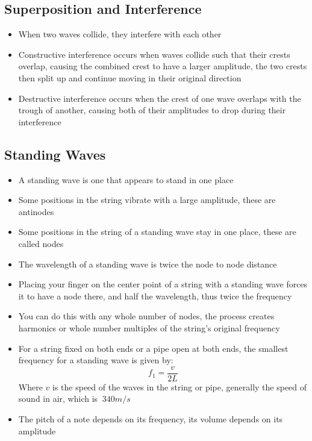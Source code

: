\subsection{Superposition and Interference}
\begin{itemize}
    \item When two waves collide, they interfere with each other
    \item Constructive interference occurs when waves collide such that their crests overlap, causing the combined crest to have a larger amplitude, the two crests then split up and continue moving in their original direction
    \item Destructive interference occurs when the crest of one wave overlaps with the trough of another, causing both of their amplitudes to drop during their interference
\end{itemize}

\subsection{Standing Waves}
\begin{itemize}
    \item A standing wave is one that appears to stand in one place
    \item Some positions in the string vibrate with a large amplitude, these are antinodes
    \item Some positions in the string of a standing wave stay in one place, these are called nodes
    \item The wavelength of a standing wave is twice the node to node distance
    \item Placing your finger on the center point of a string with a standing wave forces it to have a node there, and half the wavelength, thus twice the frequency
    \item You can do this with any whole number of nodes, the process creates harmonics or whole number multiples of the string's original frequency
    \item For a string fixed on both ends or a pipe open at both ends, the smallest frequency for a standing wave is given by: \[f_1=\frac{v}{2L}\] Where \(v\) is the speed of the waves in the string or pipe, generally the speed of sound in air, which is \(~340m/s\)
    \item The pitch of a note depends on its frequency, its volume depends on its amplitude
\end{itemize}

